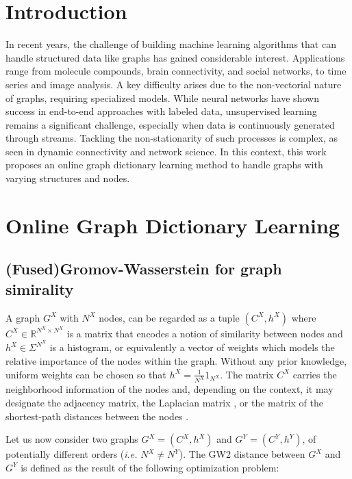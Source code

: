 \documentclass[preprint,11pt]{elsarticle}
\begin{document}
\section{Introduction}
    In recent years, the challenge of building machine learning algorithms that can handle structured data like graphs has gained considerable interest. Applications range from molecule compounds, brain connectivity, and social networks, to time series and image analysis. A key difficulty arises due to the non-vectorial nature of graphs, requiring specialized models. While neural networks have shown success in end-to-end approaches with labeled data, unsupervised learning remains a significant challenge, especially when data is continuously generated through streams. Tackling the non-stationarity of such processes is complex, as seen in dynamic connectivity and network science. In this context, this work proposes an online graph dictionary learning method to handle graphs with varying structures and nodes.

\section{\textbf{Online Graph Dictionary Learning}}
    \subsection{{\textbf{(Fused)Gromov-Wasserstein for graph simirality}}}
    
A graph \( G^X \) with \( N^X \) nodes, can be regarded as a tuple \( (C^X, h^X) \) where \( C^X \in \mathbb{R}^{N^X \times N^X} \) is a matrix that encodes a notion of similarity between nodes and \( h^X \in \Sigma^{N^X} \) is a histogram, or equivalently a vector of weights which models the relative importance of the nodes within the graph. Without any prior knowledge, uniform weights can be chosen so that \( h^X = \frac{1}{N^X} 1_{N^X} \). The matrix \( C^X \) carries the neighborhood information of the nodes and, depending on the context, it may designate the adjacency matrix, the Laplacian matrix \cite{maretic2019got}, or the matrix of the shortest-path distances between the nodes \cite{bavaud2010euclidean}. 

Let us now consider two graphs \( G^X = (C^X, h^X) \) and \( G^Y = (C^Y, h^Y) \), of potentially different orders (\textit{i.e.} \( N^X \neq N^Y \)). The GW2 distance between \( G^X \) and \( G^Y \) is defined as the result of the following optimization problem:
\end{document}
